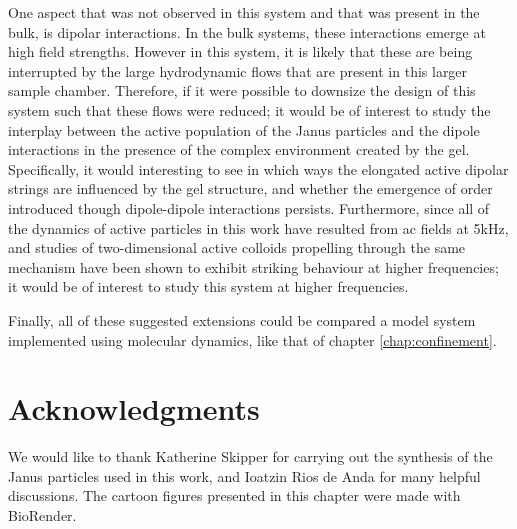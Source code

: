 One aspect that was not observed in this system and that was present in the bulk, is dipolar interactions. In the bulk systems, these interactions emerge at high field strengths. However in this system, it is likely that these are being interrupted by the large hydrodynamic flows that are present in this larger sample chamber. 
Therefore, if it were possible to downsize the design of this system such that these flows were reduced; it would be of interest to study the interplay between the active population of the Janus particles and the dipole interactions in the presence of the complex environment created by the gel. Specifically, it would interesting to see in which ways the elongated active dipolar strings are influenced by the gel structure, and whether the emergence of order introduced though dipole-dipole interactions persists.
Furthermore, since all of the dynamics of active particles in this work have resulted from ac fields at 5kHz, and studies of two-dimensional active colloids propelling through the same mechanism have been shown to exhibit striking behaviour at higher frequencies; it would be of interest to study this system at higher frequencies.

Finally, all of these suggested extensions could be compared a model system implemented using molecular dynamics, like that of chapter \ref{chap:confinement}. 




\section*{Acknowledgments}
	We would like to thank Katherine Skipper for carrying out the synthesis of the Janus particles used in this work, and Ioatzin Rios de Anda for many helpful discussions. The cartoon figures presented in this chapter were made with BioRender. 

